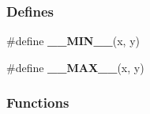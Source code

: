 \subsubsection*{Defines}
\begin{CompactItemize}
\item 
\#define \textbf{\_\-\_\-MIN\_\-\_\-}(x, y)\label{nr__levmar_8c_dd73ec9a0a73a097f8b71a96880aee73}

\item 
\#define \textbf{\_\-\_\-MAX\_\-\_\-}(x, y)\label{nr__levmar_8c_d2fc73ab898a3b72dda204a835aad51b}

\end{CompactItemize}
\subsubsection*{Functions}
